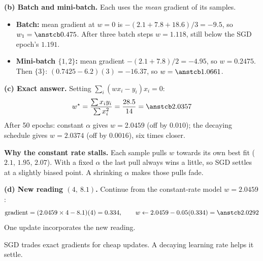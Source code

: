 \begin{frame}{}
  \textbf{(b) Batch and mini-batch.} Each uses the \emph{mean} gradient of its samples.
  \begin{itemize}\small
    \item \textbf{Batch:} mean gradient at $w = 0$ is $-(2.1 + 7.8 + 18.6)/3 = -9.5$, so $w_1 = \ans{0.475}$.
          After three batch steps $w = 1.118$, still below the SGD epoch's $1.191$.
    \item \textbf{Mini-batch $\{1,2\}$:} mean gradient $-(2.1 + 7.8)/2 = -4.95$, so $w = 0.2475$.
          Then $\{3\}$: $(0.7425 - 6.2)(3) = -16.37$, so $w = \ans{1.0661}$.
  \end{itemize}
  \textbf{(c) Exact answer.} Setting $\sum_i (wx_i - y_i)x_i = 0$:
  \[
    w^\star = \frac{\sum x_iy_i}{\sum x_i^2} = \frac{28.5}{14} = \ans{2.0357}
  \]
  After 50 epochs: constant $\alpha$ gives $w = 2.0459$ (off by $0.010$);
  the decaying schedule gives $w = 2.0374$ (off by $0.0016$), six times closer.
\end{frame}

\begin{frame}{}
  \textbf{Why the constant rate stalls.} Each sample pulls $w$ towards its own best fit
  ($2.1$, $1.95$, $2.07$). With a fixed $\alpha$ the last pull always wins a little, so SGD settles at a slightly
  biased point. A shrinking $\alpha$ makes those pulls fade.

  \vspace{4pt}
  \textbf{(d) New reading $(4,\ 8.1)$.} Continue from the constant-rate model $w = 2.0459$:
  \[
    \text{gradient} = (2.0459\times4 - 8.1)(4) = 0.334,\qquad
    w \leftarrow 2.0459 - 0.05(0.334) = \ans{2.0292}
  \]
  One update incorporates the new reading.
  \begin{keybox}
    SGD trades exact gradients for cheap updates. A decaying learning rate helps it settle.
  \end{keybox}
\end{frame}
